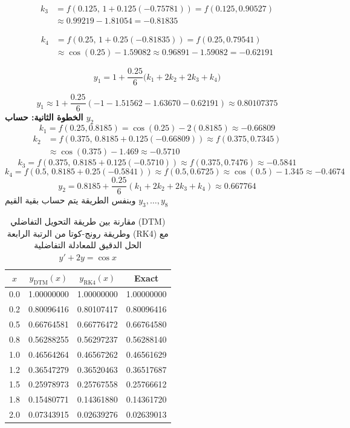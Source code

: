 \begin{example}
		\[
		\begin{split}
			k_3 &= f\left(0.125,\, 1 + 0.125(-0.75781)\right) 
			= f(0.125, 0.90527) \\
			&\approx 0.99219-1.81054 
			= -0.81835
		\end{split}
		\]
		
		\[
		\begin{split}
			k_4 &= f\left(0.25,\, 1 + 0.25(-0.81835)\right) 
			= f(0.25, 0.79541) \\
			&\approx \cos(0.25)-1.59082 
			\approx 0.96891-1.59082 
			= -0.62191
		\end{split}
		\]
		
		\[
		y_1 = 1 + \frac{0.25}{6}\big(k_1 + 2k_2 + 2k_3 + k_4\big)
		\]
		
		\[
		y_1 \approx 1 + \frac{0.25}{6}(-1 -1.51562 -1.63670 -0.62191)
		\approx 0.80107375
		\]
		\textbf{الخطوة الثانية: حساب \(y_2\)}
		\[
		k_1 = f(0.25,0.8185)=\cos(0.25)-2(0.8185)\approx -0.66809
		\]
		\[
		\begin{split}
			k_2 &= f(0.375,\, 0.8185+0.125(-0.66809))
			\approx f(0.375,0.7345)\\
			&\approx \cos(0.375)-1.469
			\approx -0.5710
		\end{split}
		\]
		\[
		k_3 = f(0.375,\, 0.8185+0.125(-0.5710))
		\approx f(0.375,0.7476)
		\approx -0.5841
		\]
		\[
		k_4 = f(0.5,\, 0.8185+0.25(-0.5841))
		\approx f(0.5,0.6725)
		\approx \cos(0.5)-1.345
		\approx -0.4674
		\]
		\[
		y_2 = 0.8185 + \frac{0.25}{6}(k_1+2k_2+2k_3+k_4)
		\approx 0.667764
		\]
			وبنفس الطريقة يتم حساب بقية القيم \(y_3,\dots,y_8\)

\begin{table}[h]
	\centering
	\renewcommand{\arraystretch}{1.5}
	\begin{tabular}{|c|c|c|c|}
		\hline
		$x$ & $y_{\text{DTM}}(x)$ & $y_{\text{RK4}}(x)$ & Exact \\ 
		\hline
		0.0 & 1.00000000 & 1.00000000 & 1.00000000 \\ 
		0.2 & 0.80096416 & 0.80107417 & 0.80096416 \\ 
		0.5 & 0.66764581 & 0.66776472 & 0.66764580 \\ 
		0.8 & 0.56288255 & 0.56297237 & 0.56288140 \\ 
		1.0 & 0.46564264 & 0.46567262 & 0.46561629 \\ 
		1.2 & 0.36547279 & 0.36520463 & 0.36517687 \\ 
		1.5 & 0.25978973 & 0.25767558 & 0.25766612 \\ 
		1.8 & 0.15480771 & 0.14361880 & 0.14361720 \\ 
		2.0 & 0.07343915 & 0.02639276 & 0.02639013 \\ 
		\hline
	\end{tabular}
	\caption{\centering مقارنة بين طريقة التحويل التفاضلي (DTM) وطريقة رونج-كوتا من الرتبة الرابعة (RK4) مع الحل الدقيق للمعادلة التفاضلية 
		$y' + 2y = \cos x$}
\end{table}


\end{example}

